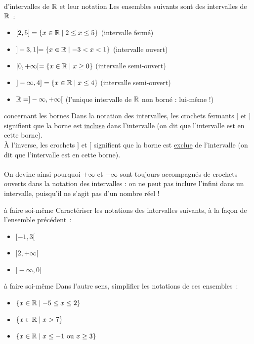 \begin{exemple}{}{d'intervalles de $\mathbb{R}$ et leur notation}
    Les ensembles suivants sont des intervalles de $\mathbb{R}$~:
    \begin{itemize}
        \item $[2, 5] = \{ x \in \mathbb{R} \mid 2 \leq x \leq 5 \}$ (intervalle fermé)
        \item $] -3, 1 [ = \{ x \in \mathbb{R} \mid -3 < x < 1 \}$ (intervalle ouvert)
        \item $[0, +\infty[ = \{ x \in \mathbb{R} \mid x \geq 0 \}$ (intervalle semi-ouvert)
        \item $]-\infty, 4] = \{ x \in \mathbb{R} \mid x \leq 4 \}$ (intervalle semi-ouvert)
        \item $\mathbb{R} = ]-\infty, +\infty[$ (l'unique intervalle de $\mathbb{R}$ non borné : lui-même !)
    \end{itemize}
\end{exemple}

\begin{remarque}{}{concernant les bornes}
    Dans la notation des intervalles, les crochets fermants $[$ et $]$ signifient que la borne est \underline{incluse} dans l'intervalle (on dit que l'intervalle est  en cette borne). \\
    À l'inverse, les crochets $]$ et $[$ signifient que la borne est \underline{exclue} de l'intervalle (on dit que l'intervalle est  en cette borne).\\\\
    On devine ainsi pourquoi $+\infty$ et $-\infty$ sont toujours accompagnés de crochets ouverts dans la notation des intervalles : on ne peut pas inclure l'infini dans un intervalle, puisqu'il ne s'agit pas d'un nombre réel !
\end{remarque}

\begin{exemple}{}{à faire soi-même}
    Caractériser les notations des intervalles suivants, à la façon de l'ensemble précédent~:
    \begin{itemize} 
        \item $[-1, 3[$
        \item $]2, +\infty[$
        \item $]-\infty, 0]$
    \end{itemize}
\end{exemple}

\begin{exemple}{}{à faire soi-même}
    Dans l'autre sens, simplifier les notations de ces ensembles~:
    \begin{itemize} 
        \item $\{ x \in \mathbb{R} \mid -5 \leq x \leq 2 \}$
        \item $\{ x \in \mathbb{R} \mid x > 7 \}$
        \item $\{ x \in \mathbb{R} \mid x \leq -1 \text{ ou } x \geq 3 \}$
    \end{itemize}
\end{exemple}

